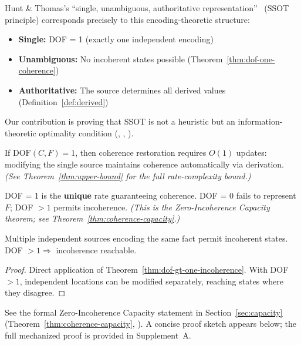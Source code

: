 Hunt \& Thomas's ``single, unambiguous, authoritative representation''~\cite{hunt1999pragmatic} (SSOT principle) corresponds precisely to this encoding-theoretic structure:
\begin{itemize}
\tightlist
\item \textbf{Single:} DOF = 1 (exactly one independent encoding)
\item \textbf{Unambiguous:} No incoherent states possible (Theorem~\ref{thm:dof-one-coherence})
\item \textbf{Authoritative:} The source determines all derived values (Definition~\ref{def:derived})
\end{itemize}

Our contribution is proving that SSOT is not a heuristic but an information-theoretic optimality condition (, , ).

\begin{corollary}[DOF = 1 Achieves $O(1)$ Update]\label{thm:ssot-optimal}
If $\text{DOF}(C, F) = 1$, then coherence restoration requires $O(1)$ updates: modifying the single source maintains coherence automatically via derivation. \emph{(See Theorem~\ref{thm:upper-bound} for the full rate-complexity bound.)}
\end{corollary}

\begin{corollary}\label{thm:ssot-unique}
DOF = 1 is the \textbf{unique} rate guaranteeing coherence. DOF = 0 fails to represent $F$; DOF $> 1$ permits incoherence. \emph{(This is the Zero-Incoherence Capacity theorem; see Theorem~\ref{thm:coherence-capacity}.)}
\end{corollary}

\begin{corollary}\label{cor:no-redundancy}
Multiple independent sources encoding the same fact permit incoherent states. DOF $> 1 \Rightarrow$ incoherence reachable.
\end{corollary}

\begin{proof}
Direct application of Theorem~\ref{thm:dof-gt-one-incoherence}. With DOF $> 1$, independent locations can be modified separately, reaching states where they disagree.
\end{proof}
See the formal Zero-Incoherence Capacity statement in Section~\ref{sec:capacity} (Theorem~\ref{thm:coherence-capacity}, ). A concise proof sketch appears below; the full mechanized proof is provided in Supplement~A.

